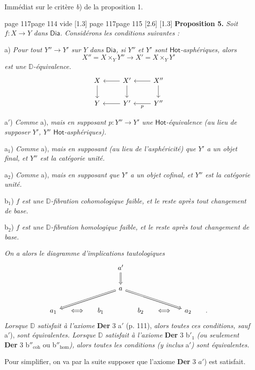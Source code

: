 \documentclass[11pt,leqno]{article}
\newcommand{\printedpage}[1]{\marginnote{\scriptsize\sffamily ed.\ #1}}
\newcommand{\msp}[1]{%
  \begingroup\def\thismsp{#1}\def\blankmsp{page 114 vide}%
  \ifx\thismsp\blankmsp
    \marginnote{\scriptsize\sffamily [114: vide]}[1.3\baselineskip]%
  \else\def\followingmsp{page 115}%
    \ifx\thismsp\followingmsp
      \marginnote{\scriptsize\sffamily [page 115]}[2.6\baselineskip]%
    \else\marginnote{\scriptsize\sffamily [#1]}[1.3\baselineskip]\fi
  \fi\endgroup}
\newcommand{\Dia}{\ensuremath{\mathsf{Dia}}}
\newcommand{\Hot}{\ensuremath{\mathsf{Hot}}}
\newcommand{\D}{\ensuremath{\mathbb{D}}}
\begin{document}
Immédiat sur le critère \textit{b}) de la proposition 1.

\msp{page 117}\textbf{Proposition 5.} \textit{Soit $f : X \to Y$ dans \Dia. Considérons les conditions suivantes :}

a) \textit{Pour tout $Y'' \to Y'$ sur $Y$ dans \Dia, si $Y''$ et $Y'$ sont \Hot-asphériques, alors}
\[
X'' = X \times_Y Y'' \longrightarrow X' = X \times_Y Y'
\]
\textit{est une $\D$-équivalence.}
\[
\begin{tikzcd}
X & X' \arrow[l] & X'' \arrow[l] \\
Y \arrow[from=u] & Y' \arrow[l] \arrow[from=u] & Y'' \arrow[l, "p"] \arrow[from=u]
\end{tikzcd}
\]

a$'$) \textit{Comme} a), \textit{mais en supposant $p : Y'' \to Y'$ une \Hot-équivalence (au lieu de supposer $Y'$, $Y''$ \Hot-asphériques).}

a$_1$) \textit{Comme} a), \textit{mais en supposant (au lieu de l'asphéricité) que $Y'$ a un objet final, et $Y''$ est la catégorie unité.}

a$_2$) \textit{Comme} a), \textit{mais en supposant que $Y'$ a un objet cofinal, et $Y''$ est la catégorie unité.}

b$_1$) \textit{$f$ est une $\D$-fibration cohomologique faible, et le reste après tout changement de base.}

b$_2$) \textit{$f$ est une $\D$-fibration homologique faible, et le reste après tout changement de base.}

\printedpage{70}
\textit{On a alors le diagramme d'implications tautologiques}
\[
\begin{tikzcd}[column sep=small]
& & & a' \arrow[d, Rightarrow] & & & & \\
& & & a \arrow[dlll, Rightarrow] \arrow[drrr, Rightarrow] & & & & \\
a_1 & \Longleftrightarrow & b_1 & & b_2 & \Longleftrightarrow & a_2 & .
\end{tikzcd}
\]
\textit{Lorsque $\D$ satisfait à l'axiome} \textbf{Der} 3 a$'$ (p. 111), \textit{alors toutes ces conditions, sauf} a$'$), \textit{sont équivalentes. Lorsque $\D$ satisfait à l'axiome} \textbf{Der} 3 b$'_1$ \textit{(ou seulement} \textbf{Der} 3 b$''_{\mathrm{coh}}$ ou b$''_{\mathrm{hom}}$\textit{),} \textit{alors toutes les conditions (y inclus} a$'$\textit{) sont équivalentes.}

Pour simplifier, on va par la suite supposer que l'axiome \textbf{Der} 3 $a'$) est satisfait.
\end{document}
